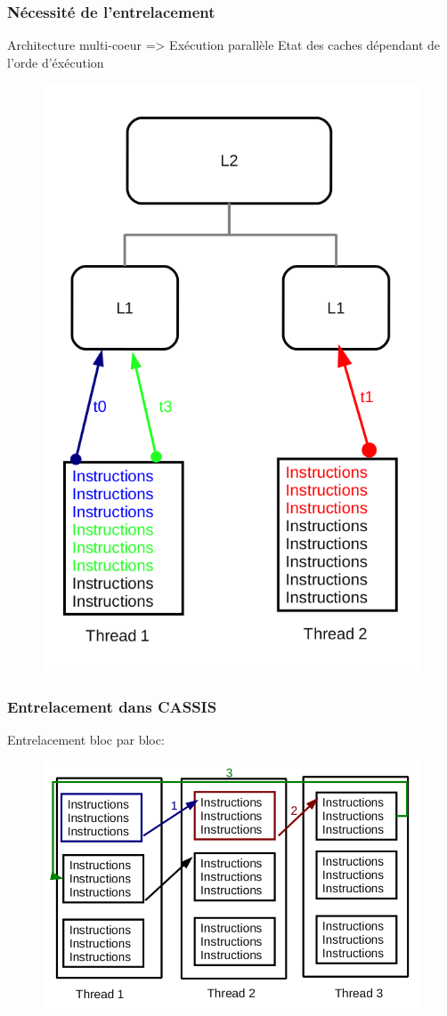 
\begin{frame}
 \frametitle{Nécessité de l'entrelacement}
 Architecture multi-coeur => Exécution parallèle
 Etat des caches dépendant de l'orde d'éxécution
 \begin{figure}
   \includegraphics[scale=0.4]{images/schema_entrelacement.png}
 \end{figure}
\end{frame}

\begin{frame}
 \frametitle{Entrelacement dans CASSIS}
 Entrelacement bloc par bloc:
 \begin{figure}
   \includegraphics[scale=0.4]{images/schema_lua.png}
 \end{figure}
\end{frame}
